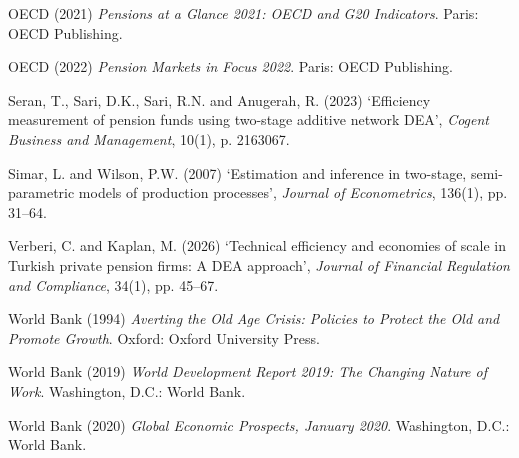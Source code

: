 \documentclass[12pt,a4paper]{article}
\begin{document}
\begin{description}[style=nextline, leftmargin=0pt, labelwidth=0pt, itemsep=0.5em]
\item OECD (2021) \textit{Pensions at a Glance 2021: OECD and G20 Indicators}. Paris: OECD Publishing.

\item OECD (2022) \textit{Pension Markets in Focus 2022}. Paris: OECD Publishing.

\item Seran, T., Sari, D.K., Sari, R.N. and Anugerah, R. (2023) `Efficiency measurement of pension funds using two-stage additive network DEA', \textit{Cogent Business and Management}, 10(1), p. 2163067.

\item Simar, L. and Wilson, P.W. (2007) `Estimation and inference in two-stage, semi-parametric models of production processes', \textit{Journal of Econometrics}, 136(1), pp. 31--64.

\item Verberi, C. and Kaplan, M. (2026) `Technical efficiency and economies of scale in Turkish private pension firms: A DEA approach', \textit{Journal of Financial Regulation and Compliance}, 34(1), pp. 45--67.

\item World Bank (1994) \textit{Averting the Old Age Crisis: Policies to Protect the Old and Promote Growth}. Oxford: Oxford University Press.

\item World Bank (2019) \textit{World Development Report 2019: The Changing Nature of Work}. Washington, D.C.: World Bank.

\item World Bank (2020) \textit{Global Economic Prospects, January 2020}. Washington, D.C.: World Bank.

\end{description}

\end{document}
